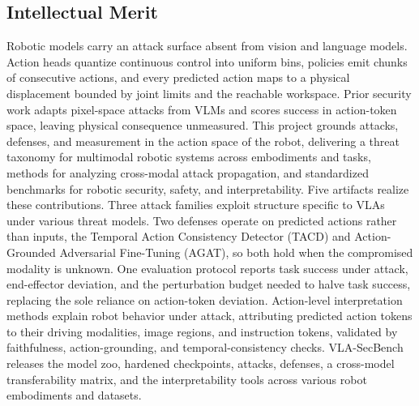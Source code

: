 \documentclass[11pt,letterpaper]{article}
\begin{document}
\subsection{Intellectual Merit}
Robotic models carry an attack surface absent from vision and language models. Action heads {quantize continuous control into uniform bins}, policies emit chunks of consecutive actions, and every predicted action maps to a physical displacement bounded by joint limits and the reachable workspace. Prior security work adapts pixel-space attacks from VLMs and scores success in action-token space, leaving physical consequence unmeasured. 
This project grounds attacks, defenses, and measurement in the action space of the robot, delivering  a threat taxonomy for multimodal robotic systems across embodiments and tasks,  methods for analyzing cross-modal attack propagation, and  standardized benchmarks for robotic security, safety, and interpretability. Five artifacts realize these contributions.
 Three attack families exploit structure specific to VLAs under various threat models. 
 Two defenses operate on predicted actions rather than inputs, the Temporal Action Consistency Detector (TACD) and Action-Grounded Adversarial Fine-Tuning (AGAT), so both hold when the compromised modality is unknown. 
 One evaluation protocol reports task success under attack, end-effector deviation, and the perturbation budget needed to halve task success, replacing the sole reliance on action-token deviation.
 Action-level interpretation methods explain robot behavior under attack, attributing predicted action tokens to their driving modalities, image regions, and instruction tokens, validated by faithfulness, action-grounding, and temporal-consistency checks.
 VLA-SecBench releases the model zoo, hardened checkpoints, attacks, defenses, a cross-model transferability matrix, and the interpretability tools across various robot embodiments and datasets.
\end{document}
